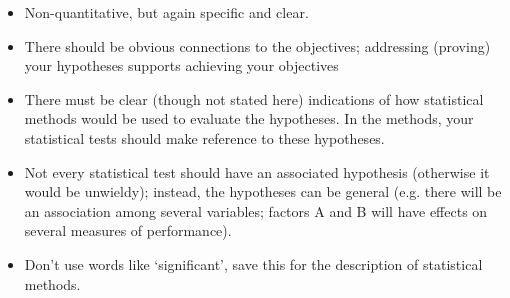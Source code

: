 \begin{itemize}
  \item Non-quantitative, but again specific and clear.
  \item There should be obvious connections to the objectives; addressing (proving) your hypotheses
  supports achieving your objectives
  \item There must be clear (though not stated here) indications of how statistical methods would be
  used to evaluate the hypotheses. In the methods, your statistical tests should make reference to 
  these hypotheses.
  \item Not every statistical test should have an associated hypothesis (otherwise it would be
  unwieldy); instead, the hypotheses can be general (e.g. there will be an association among several 
  variables; factors A and B will have effects on several measures of performance).
  \item Don’t use words like ‘significant’, save this for the description of statistical methods.
\end{itemize}

